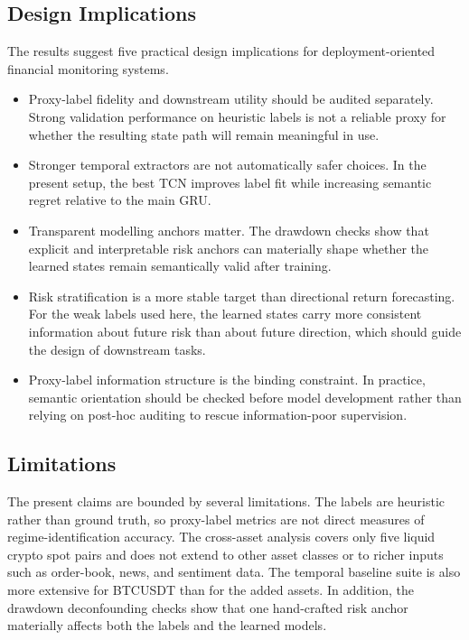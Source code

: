 \documentclass[a4paper,fleqn]{cas-dc}
\begin{document}
\subsection{Design Implications}
The results suggest five practical design implications for deployment-oriented financial monitoring systems.
\begin{itemize}
\item Proxy-label fidelity and downstream utility should be audited separately. Strong validation performance on heuristic labels is not a reliable proxy for whether the resulting state path will remain meaningful in use.
\item Stronger temporal extractors are not automatically safer choices. In the present setup, the best TCN improves label fit while increasing semantic regret relative to the main GRU.
\item Transparent modelling anchors matter. The drawdown checks show that explicit and interpretable risk anchors can materially shape whether the learned states remain semantically valid after training.
\item Risk stratification is a more stable target than directional return forecasting. For the weak labels used here, the learned states carry more consistent information about future risk than about future direction, which should guide the design of downstream tasks.
\item Proxy-label information structure is the binding constraint. In practice, semantic orientation should be checked before model development rather than relying on post-hoc auditing to rescue information-poor supervision.
\end{itemize}

\subsection{Limitations}
The present claims are bounded by several limitations. The labels are heuristic rather than ground truth, so proxy-label metrics are not direct measures of regime-identification accuracy. The cross-asset analysis covers only five liquid crypto spot pairs and does not extend to other asset classes or to richer inputs such as order-book, news, and sentiment data. The temporal baseline suite is also more extensive for BTCUSDT than for the added assets. In addition, the drawdown deconfounding checks show that one hand-crafted risk anchor materially affects both the labels and the learned models.
\end{document}
